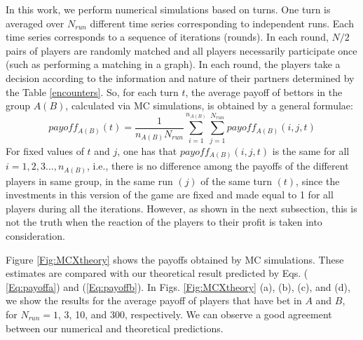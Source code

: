 \documentclass[3p, 11pt]{elsarticle}
\begin{document}
In this work, we perform numerical simulations based on turns. One turn is
averaged over $N_{run}$ different time series corresponding to independent
runs. Each time series corresponds to a sequence of iterations (rounds). In
each round, $N/2$ pairs of players are randomly matched and all players
necessarily participate once (such as performing a matching in a graph). In
each round, the players take a decision according to the information and
nature of their partners determined by the Table \ref{encounters}. So, for
each turn $t$, the average payoff of bettors in the group $A(B)$, calculated
via MC simulations, is obtained by a general formulae: 
\begin{equation*}
payoff_{A(B)}(t)=\frac{1}{n_{A(B)}N_{run}}\sum_{i=1}^{n_{A(B)}}\sum%
\limits_{j=1}^{N_{run}}payoff_{A(B)}(i,j,t)
\end{equation*}%
For fixed values of $t$ and $j$, one has that $payoff_{A(B)}(i,j,t)$ is the
same for all $i=1,2,3...,n_{A(B)}$, i.e., there is no difference among the
payoffs of the different players in same group, in the same run $(j)$ of the
same turn $(t)$, since the investments in this version of the game are fixed
and made equal to 1 for all players during all the iterations. However, as
shown in the next subsection, this is not the truth when the reaction of the
players to their profit is taken into consideration.

Figure \ref{Fig:MCXtheory} shows the payoffs obtained by MC simulations.
These estimates are compared with our theoretical result predicted by Eqs. (%
\ref{Eq:payoffa}) and (\ref{Eq:payoffb}). In Figs. \ref{Fig:MCXtheory} (a),
(b), (c), and (d), we show the results for the average payoff of players
that have bet in $A$ and $B$, for $N_{run}=1$, 3, 10, and 300, respectively.
We can observe a good agreement between our numerical and theoretical
predictions.
\end{document}
